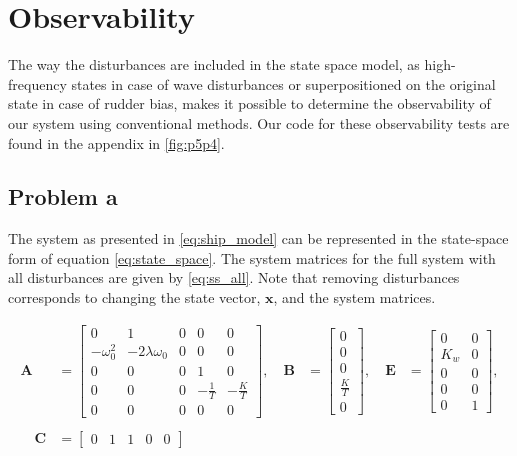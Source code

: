 \section{Observability}
The way the disturbances are included in the state space model, as high-frequency states in case of wave disturbances or superpositioned on the original state in case of rudder bias, makes it possible to determine the observability of our system using conventional methods. Our code for these observability tests are found in the appendix in \cref{fig:p5p4}.

\subsection{Problem a}
The system as presented in \cref{eq:ship_model} can be represented in the state-space form of equation \cref{eq:state_space}. The system matrices for the full system with all disturbances are given by \cref{eq:ss_all}. Note that removing disturbances corresponds to changing the state vector, $\mathbf{x}$, and the system matrices. 



\begin{equation}\label{eq:ss_all}
\begin{aligned}
\mathbf{A} &=
    \begin{bmatrix}
        0 & 1 & 0 & 0 & 0 \\
        -\omega_0^2 & -2\lambda\omega_0 & 0 & 0 & 0\\
        0 & 0 & 0 & 1 & 0 \\
        0 & 0 & 0 & -\frac{1}{T} & -\frac{K}{T} \\
        0 & 0 & 0 & 0 & 0 
    \end{bmatrix}
,\quad \mathbf{B} &=
    \begin{bmatrix}
        0 \\ 0 \\ 0 \\ \frac{K}{T} \\ 0
    \end{bmatrix}
,\quad \mathbf{E} &=
    \begin{bmatrix}
        0 & 0 \\
        K_w & 0 \\
        0 & 0 \\
        0 & 0 \\
        0 & 1 
    \end{bmatrix},
\\\\
\quad \mathbf{C} &=
    \begin{bmatrix}
        0 & 1 & 1 & 0 & 0
    \end{bmatrix}
\end{aligned}
\end{equation}


